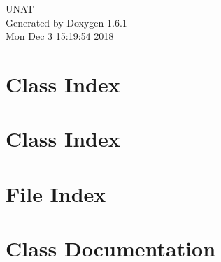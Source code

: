 \documentclass[a4paper]{book}
\begin{document}
\hypersetup{pageanchor=false}
\begin{titlepage}
\vspace*{7cm}
\begin{center}
{\Large UNAT }\\
\vspace*{1cm}
{\large Generated by Doxygen 1.6.1}\\
\vspace*{0.5cm}
{\small Mon Dec 3 15:19:54 2018}\\
\end{center}
\end{titlepage}
\clearemptydoublepage
{}
\tableofcontents
\clearemptydoublepage
{}
\hypersetup{pageanchor=true}
\chapter{Class Index}

\chapter{Class Index}

\chapter{File Index}

\chapter{Class Documentation}















\end{document}
